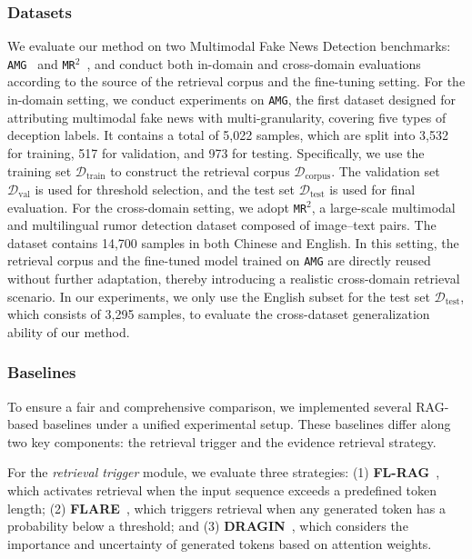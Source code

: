 \subsubsection{Datasets}
We evaluate our method on two Multimodal Fake News Detection benchmarks: \texttt{AMG}~\cite{guo2025each} and \texttt{MR$^2$}~\cite{hu2023mr2}, and conduct both in-domain and cross-domain evaluations according to the source of the retrieval corpus and the fine-tuning setting.
For the in-domain setting, we conduct experiments on \texttt{AMG}, the first dataset designed for attributing multimodal fake news with multi-granularity, covering five types of deception labels.
It contains a total of 5,022 samples, which are split into 3,532 for training, 517 for validation, and 973 for testing. Specifically, we use the training set $\mathcal{D}_{\text{train}}$ to construct the retrieval corpus $\mathcal{D}_{\text{corpus}}$. The validation set $\mathcal{D}_{\text{val}}$ is used for threshold selection, and the test set $\mathcal{D}_{\text{test}}$ is used for final evaluation.
For the cross-domain setting, we adopt \texttt{MR$^2$}, a large-scale multimodal and multilingual rumor detection dataset composed of image–text pairs. The dataset contains 14,700 samples in both Chinese and English. In this setting, the retrieval corpus and the fine-tuned model trained on \texttt{AMG} are directly reused without further adaptation, thereby introducing a realistic cross-domain retrieval scenario. In our experiments, we only use the English subset for the test set $\mathcal{D}_{\text{test}}$, which consists of 3,295 samples, to evaluate the cross-dataset generalization ability of our method.

\subsubsection{Baselines}
To ensure a fair and comprehensive comparison, we implemented several RAG-based baselines under a unified experimental setup. These baselines differ along two key components: the retrieval trigger and the evidence retrieval strategy.

For the \textit{retrieval trigger} module, we evaluate three strategies: (1) \textbf{FL-RAG}~\cite{ram2023context}, which activates retrieval when the input sequence exceeds a predefined token length; (2) \textbf{FLARE}~\cite{jiang2023active}, which triggers retrieval when any generated token has a probability below a threshold; and (3) \textbf{DRAGIN}~\cite{su2024dragin}, which considers the importance and uncertainty of generated tokens based on attention weights.

